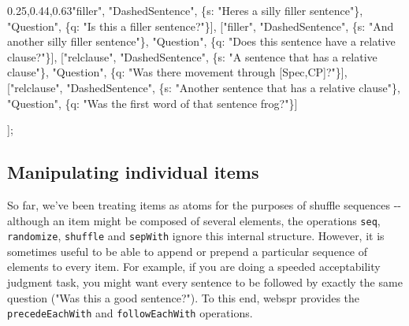 \documentclass[
]{article}
\newenvironment{Shaded}{}{}
\newcommand{\DataTypeTok}[1]{\textcolor[rgb]{0.56,0.13,0.00}{#1}}
\newcommand{\NormalTok}[1]{#1}
\newcommand{\OperatorTok}[1]{\textcolor[rgb]{0.40,0.40,0.40}{#1}}
\newcommand{\StringTok}[1]{\textcolor[rgb]{0.25,0.44,0.63}{#1}}
\begin{document}
\begin{Shaded}
\begin{Highlighting}[]
\NormalTok{    [}\StringTok{"filler"}\OperatorTok{,} \StringTok{"DashedSentence"}\OperatorTok{,}\NormalTok{ \{}\DataTypeTok{s}\OperatorTok{:} \StringTok{"Here\textquotesingle{}s a silly filler sentence"}\NormalTok{\}}\OperatorTok{,}
               \StringTok{"Question"}\OperatorTok{,}\NormalTok{ \{}\DataTypeTok{q}\OperatorTok{:} \StringTok{"Is this a filler sentence?"}\NormalTok{\}]}\OperatorTok{,}
\NormalTok{    [}\StringTok{"filler"}\OperatorTok{,} \StringTok{"DashedSentence"}\OperatorTok{,}\NormalTok{ \{}\DataTypeTok{s}\OperatorTok{:} \StringTok{"And another silly filler sentence"}\NormalTok{\}}\OperatorTok{,}
               \StringTok{"Question"}\OperatorTok{,}\NormalTok{ \{}\DataTypeTok{q}\OperatorTok{:} \StringTok{"Does this sentence have a relative clause?"}\NormalTok{\}]}\OperatorTok{,}
\NormalTok{    [}\StringTok{"relclause"}\OperatorTok{,} \StringTok{"DashedSentence"}\OperatorTok{,}\NormalTok{ \{}\DataTypeTok{s}\OperatorTok{:} \StringTok{"A sentence that has a relative clause"}\NormalTok{\}}\OperatorTok{,}
                  \StringTok{"Question"}\OperatorTok{,}\NormalTok{ \{}\DataTypeTok{q}\OperatorTok{:} \StringTok{"Was there movement through [Spec,CP]?"}\NormalTok{\}]}\OperatorTok{,}
\NormalTok{    [}\StringTok{"relclause"}\OperatorTok{,} \StringTok{"DashedSentence"}\OperatorTok{,}\NormalTok{ \{}\DataTypeTok{s}\OperatorTok{:} \StringTok{"Another sentence that has a relative clause"}\NormalTok{\}}\OperatorTok{,}
                  \StringTok{"Question"}\OperatorTok{,}\NormalTok{ \{}\DataTypeTok{q}\OperatorTok{:} \StringTok{"Was the first word of that sentence \textquotesingle{}frog\textquotesingle{}?"}\NormalTok{\}]}

\NormalTok{    ]}\OperatorTok{;}
\end{Highlighting}
\end{Shaded}

\hypertarget{manipulating-individual-items}{%
\subsection{Manipulating individual
items}\label{manipulating-individual-items}}

So far, we've been treating items as atoms for the purposes of shuffle
sequences -\/- although an item might be composed of several elements,
the operations \texttt{seq}, \texttt{randomize}, \texttt{shuffle} and
\texttt{sepWith} ignore this internal structure. However, it is
sometimes useful to be able to append or prepend a particular sequence
of elements to every item. For example, if you are doing a speeded
acceptability judgment task, you might want every sentence to be
followed by exactly the same question ("Was this a good sentence?"). To
this end, webspr provides the \texttt{precedeEachWith} and
\texttt{followEachWith} operations.
\end{document}
